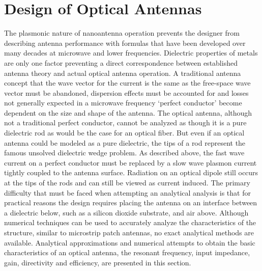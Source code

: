 \documentclass[11pt]{article}
\begin{document}
\section{Design of Optical Antennas}
%
The plasmonic nature of nanoantenna operation prevents the designer from describing antenna performance with formulas that have been developed over many decades at microwave and lower frequencies. Dielectric properties of metals are only one factor preventing a direct correspondence between established antenna theory and actual optical antenna operation. A traditional antenna concept that the wave vector for the current is the same as the free-space wave vector must be abandoned, dispersion effects must be accounted for and losses not generally expected in a microwave frequency  `perfect conductor' become dependent on the size and shape of the antenna.
The optical antenna, although not a traditional perfect conductor, cannot be analyzed as though it is a pure dielectric rod as would be the case for an optical fiber. But even if an optical antenna could be modeled as a pure dielectric, the tips of a rod represent the famous unsolved dielectric wedge problem. As described above, the fast wave current on a perfect conductor must be replaced by a slow wave plasmon current tightly coupled to the antenna surface. Radiation on an optical dipole still occurs at the tips of the rods and can still be viewed as current induced. The primary difficulty that must be faced when attempting an analytical analysis is that for practical reasons the design requires placing the antenna on an interface between a dielectric below, such as a silicon dioxide substrate, and air above. Although numerical techniques can be used to accurately analyze the characteristics of the structure, similar to microstrip patch antennas, no exact analytical methods are available. Analytical approximations and numerical attempts to obtain the basic characteristics of an optical antenna, the resonant frequency, input impedance, gain, directivity and efficiency, are presented in this section.
\end{document}
